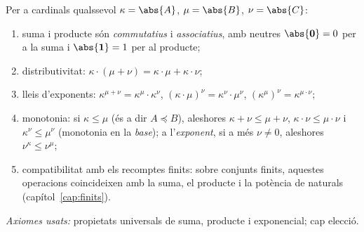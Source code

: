 \begin{proposicio}\label{prop:lleis-cardinals}
Per a cardinals qualssevol \(\kappa=\abs{A}\), \(\mu=\abs{B}\),
\(\nu=\abs{C}\):
\begin{enumerate}
\item suma i producte són \emph{commutatius} i \emph{associatius}, amb neutres
\(\abs{\mathbf0}=0\) per a la suma i \(\abs{\mathbf1}=1\) per al producte;
\item distributivitat: \(\kappa\cdot(\mu+\nu)=\kappa\cdot\mu+\kappa\cdot\nu\);
\item lleis d'exponents: \(\kappa^{\mu+\nu}=\kappa^{\mu}\cdot\kappa^{\nu}\),
\((\kappa\cdot\mu)^{\nu}=\kappa^{\nu}\cdot\mu^{\nu}\),
\((\kappa^{\mu})^{\nu}=\kappa^{\mu\cdot\nu}\);
\item monotonia: si \(\kappa\le\mu\) (és a dir \(A\preceq B\)), aleshores
\(\kappa+\nu\le\mu+\nu\), \(\kappa\cdot\nu\le\mu\cdot\nu\) i
\(\kappa^{\nu}\le\mu^{\nu}\) (monotonia en la \emph{base}); a l'\emph{exponent},
si a més \(\nu\neq 0\), aleshores \(\nu^{\kappa}\le\nu^{\mu}\);
\item compatibilitat amb els recomptes finits: sobre conjunts finits, aquestes
operacions coincideixen amb la suma, el producte i la potència de naturals
(capítol~\ref{cap:finits}).
\end{enumerate}
\emph{Axiomes usats:} propietats universals de suma, producte i exponencial;
cap elecció.
\end{proposicio}

